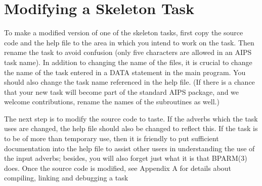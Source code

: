 \section{Modifying a Skeleton Task}
 To make a modified version of one of the skeleton tasks, first copy
the source code and the help file to the area in which you intend to
work on the task.  Then rename the task to avoid confusion (only five
characters are allowed in an AIPS task name).  In addition to changing
the name of the files, it is crucial to change the name of the task
entered in a DATA statement in the main program. You should also
change the task name referenced in the help file. (If there is a
chance that your new task will become part of the standard AIPS
package, and we welcome contributions, rename the names of the
subroutines as well.)

The next step is to modify the source code to taste.  If the adverbs
which the task uses are changed, the help file should also be changed
to reflect this. If the task is to be of more than temporary use, then
it is friendly to put sufficient documentation into the help file to
assist other users in understanding the use of the input adverbs;
besides, you will also forget just what it is that BPARM(3) does.
Once the source code is modified, see Appendix A for details about
compiling, linking and debugging a task



